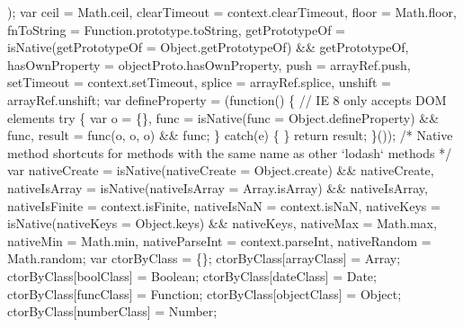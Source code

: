 \begin{DoxyCodeInclude}
\textcolor{stringliteral}{    );}
\textcolor{stringliteral}{}
\textcolor{stringliteral}{    var ceil = Math.ceil,}
\textcolor{stringliteral}{        clearTimeout = context.clearTimeout,}
\textcolor{stringliteral}{        floor = Math.floor,}
\textcolor{stringliteral}{        fnToString = Function.prototype.toString,}
\textcolor{stringliteral}{        getPrototypeOf = isNative(getPrototypeOf = Object.getPrototypeOf) && getPrototypeOf,}
\textcolor{stringliteral}{        hasOwnProperty = objectProto.hasOwnProperty,}
\textcolor{stringliteral}{        push = arrayRef.push,}
\textcolor{stringliteral}{        setTimeout = context.setTimeout,}
\textcolor{stringliteral}{        splice = arrayRef.splice,}
\textcolor{stringliteral}{        unshift = arrayRef.unshift;}
\textcolor{stringliteral}{}
\textcolor{stringliteral}{    var defineProperty = (function() \{}
\textcolor{stringliteral}{      // IE 8 only accepts DOM elements}
\textcolor{stringliteral}{      try \{}
\textcolor{stringliteral}{        var o = \{\},}
\textcolor{stringliteral}{            func = isNative(func = Object.defineProperty) && func,}
\textcolor{stringliteral}{            result = func(o, o, o) && func;}
\textcolor{stringliteral}{      \} catch(e) \{ \}}
\textcolor{stringliteral}{      return result;}
\textcolor{stringliteral}{    \}());}
\textcolor{stringliteral}{}
\textcolor{stringliteral}{    /* Native method shortcuts for methods with the same name as other `lodash` methods */}
\textcolor{stringliteral}{    var nativeCreate = isNative(nativeCreate = Object.create) && nativeCreate,}
\textcolor{stringliteral}{        nativeIsArray = isNative(nativeIsArray = Array.isArray) && nativeIsArray,}
\textcolor{stringliteral}{        nativeIsFinite = context.isFinite,}
\textcolor{stringliteral}{        nativeIsNaN = context.isNaN,}
\textcolor{stringliteral}{        nativeKeys = isNative(nativeKeys = Object.keys) && nativeKeys,}
\textcolor{stringliteral}{        nativeMax = Math.max,}
\textcolor{stringliteral}{        nativeMin = Math.min,}
\textcolor{stringliteral}{        nativeParseInt = context.parseInt,}
\textcolor{stringliteral}{        nativeRandom = Math.random;}
\textcolor{stringliteral}{}
\textcolor{stringliteral}{    var ctorByClass = \{\};}
\textcolor{stringliteral}{    ctorByClass[arrayClass] = Array;}
\textcolor{stringliteral}{    ctorByClass[boolClass] = Boolean;}
\textcolor{stringliteral}{    ctorByClass[dateClass] = Date;}
\textcolor{stringliteral}{    ctorByClass[funcClass] = Function;}
\textcolor{stringliteral}{    ctorByClass[objectClass] = Object;}
\textcolor{stringliteral}{    ctorByClass[numberClass] = Number;}

\end{DoxyCodeInclude}

